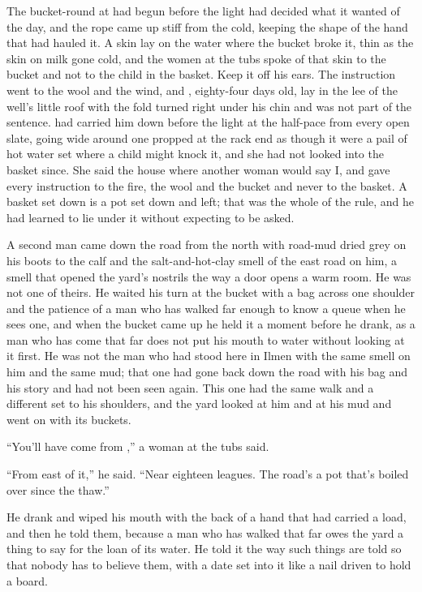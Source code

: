 
The bucket-round at  had begun before the light had decided what it wanted of the day, and the rope came up stiff from the cold, keeping the shape of the hand that had hauled it. A skin lay on the water where the bucket broke it, thin as the skin on milk gone cold, and the women at the tubs spoke of that skin to the bucket and not to the child in the basket. Keep it off his ears. The instruction went to the wool and the wind, and , eighty-four days old, lay in the lee of the well's little roof with the fold turned right under his chin and was not part of the sentence.  had carried him down before the light at the half-pace from every open slate, going wide around one propped at the rack end as though it were a pail of hot water set where a child might knock it, and she had not looked into the basket since. She said the house where another woman would say I, and gave every instruction to the fire, the wool and the bucket and never to the basket. A basket set down is a pot set down and left; that was the whole of the rule, and he had learned to lie under it without expecting to be asked.

A second man came down the road from the north with road-mud dried grey on his boots to the calf and the salt-and-hot-clay smell of the east road on him, a smell that opened the yard's nostrils the way a door opens a warm room. He was not one of theirs. He waited his turn at the bucket with a bag across one shoulder and the patience of a man who has walked far enough to know a queue when he sees one, and when the bucket came up he held it a moment before he drank, as a man who has come that far does not put his mouth to water without looking at it first. He was not the man who had stood here in Ilmen with the same smell on him and the same mud; that one had gone back down the road with his bag and his story and had not been seen again. This one had the same walk and a different set to his shoulders, and the yard looked at him and at his mud and went on with its buckets.

“You'll have come from ,” a woman at the tubs said.

“From east of it,” he said. “Near eighteen leagues. The road's a pot that's boiled over since the thaw.”

He drank and wiped his mouth with the back of a hand that had carried a load, and then he told them, because a man who has walked that far owes the yard a thing to say for the loan of its water. He told it the way such things are told so that nobody has to believe them, with a date set into it like a nail driven to hold a board.

